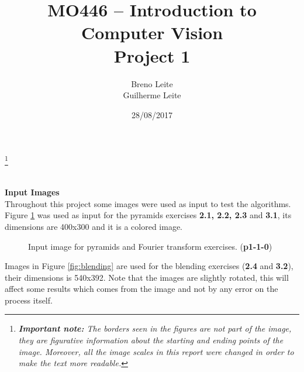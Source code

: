 \documentclass[12pt,a4paper]{article}
\title{MO446 -- Introduction to Computer Vision  \\ Project 1}
\author{Breno Leite  \\ Guilherme Leite}
\date{28/08/2017}
\newcommand\blfootnote[1]{%
	\begingroup
	\renewcommand\thefootnote{}\footnote{#1}%
	\addtocounter{footnote}{-1}%
	\endgroup
}
\begin{document}
\maketitle
\blfootnote{\textit{\textbf{Important note:} The borders seen in the figures are not part of the image, they are figurative information about the starting and ending points of the image. Moreover, all the image scales in this report were changed in order to make the text more readable.}} \\


\textbf{\LARGE Input Images}\\

Throughout this project some images were used as input to test the algorithms. Figure \ref{fig:p1-1-0} was used as input for the pyramids exercises \textbf{2.1, 2.2, 2.3} and \textbf{3.1}, its dimensions are 400x300 and it is a colored image. \\

\begin{figure}[!h]
	\centering
	{%
		\setlength{\fboxsep}{1pt}%
		\setlength{\fboxrule}{1pt}%
	}%
	\caption{Input image for pyramids and Fourier transform exercises. (\textbf{p1-1-0})}
	\label{fig:p1-1-0}
\end{figure}

\newpage

Images in Figure \ref{fig:blending} are used for the blending exercises (\textbf{2.4} and \textbf{3.2}), their dimensions is 540x392. Note that the images are slightly rotated, this will affect some results which comes from the image and not by any error on the process itself.\\
\end{document}
